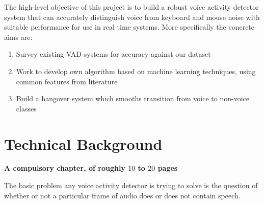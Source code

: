 \documentclass[ %
                    author={Sam Phippen},
                supervisor={Dr. Rafal Bogacz},
                     title={Real time voice activity detectors in noisy personal computing environments},
                  subtitle={},
                    degree={MEng},
                      year={2012} ]{thesis}
\begin{document}
The high-level objective of this project is to build a robust voice activity
detector system that can accurately distinguish voice from keyboard and mouse
noise with suitable performance for use in real time systems. More specifically
the concrete aims are:

\begin{enumerate}
    \item Survey existing VAD systems for accuracy against our dataset
    \item Work to develop own algorithm based on machine learning techniques,
          using common features from literature
    \item Build a hangover system which smooths transition from voice to 
          non-voice classes
\end{enumerate}




\chapter{Technical Background}
\label{chap:technical}

{\bf A compulsory chapter, of roughly $10$ to $20$ pages} 
\vspace{1cm} 

\noindent

%

The basic problem any voice activity detector is trying to solve is the
question of whether or not a particular frame of audio does or does not contain
speech.
\end{document}

